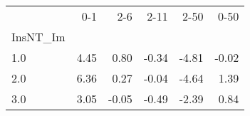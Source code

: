 \begin{tabular}{lrrrrr}
\toprule
{} &   0-1 &   2-6 &  2-11 &  2-50 &  0-50 \\
InsNT\_Im &       &       &       &       &       \\
\midrule
1.0      &  4.45 &  0.80 & -0.34 & -4.81 & -0.02 \\
2.0      &  6.36 &  0.27 & -0.04 & -4.64 &  1.39 \\
3.0      &  3.05 & -0.05 & -0.49 & -2.39 &  0.84 \\
\bottomrule
\end{tabular}

